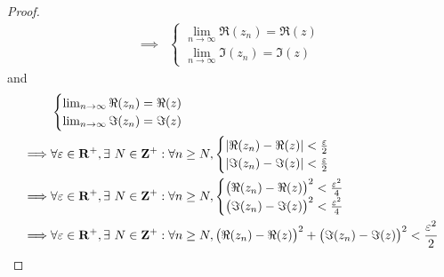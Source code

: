 \begin{proof}
\begin{align*}
        \implies & \begin{cases}
                       \lim_{n \to \infty} \Re(z_n) = \Re(z) \\
                       \lim_{n \to \infty} \Im(z_n) = \Im(z)
                   \end{cases}
    \end{align*}
    and
    \begin{align*}
                 & \begin{cases}
                       \lim_{n \to \infty} \Re(z_n) = \Re(z) \\
                       \lim_{n \to \infty} \Im(z_n) = \Im(z)
                   \end{cases}                                                                                                                                                                   \\
        \implies & \forall \varepsilon \in \mathbf{R}^+, \exists\ N \in \mathbf{Z}^+ : \forall n \geq N, \begin{cases}
                                                                                                             \abs*{\Re(z_n) - \Re(z)} < \frac{\varepsilon}{2} \\
                                                                                                             \abs*{\Im(z_n) - \Im(z)} < \frac{\varepsilon}{2}
                                                                                                         \end{cases}                                                                  \\
        \implies & \forall \varepsilon \in \mathbf{R}^+, \exists\ N \in \mathbf{Z}^+ : \forall n \geq N, \begin{cases}
                                                                                                             \big(\Re(z_n) - \Re(z)\big)^2 < \frac{\varepsilon^2}{4} \\
                                                                                                             \big(\Im(z_n) - \Im(z)\big)^2 < \frac{\varepsilon^2}{4}
                                                                                                         \end{cases}                           \\
        \implies & \forall \varepsilon \in \mathbf{R}^+, \exists\ N \in \mathbf{Z}^+ : \forall n \geq N, \big(\Re(z_n) - \Re(z)\big)^2 + \big(\Im(z_n) - \Im(z)\big)^2 < \frac{\varepsilon^2}{2}                           \\

\end{align*}
\end{proof}
